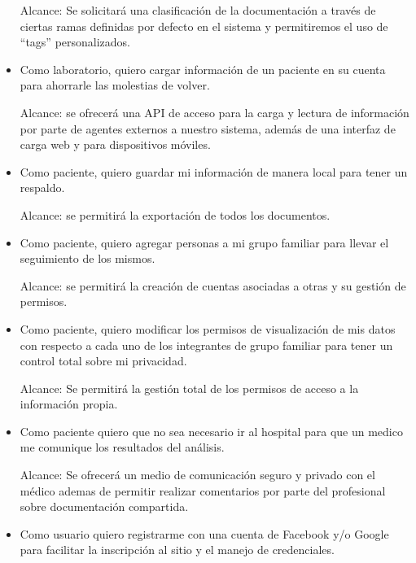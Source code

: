 \begin{itemize}
    Alcance: Se solicitará una clasificación de la documentación a través de ciertas ramas definidas por defecto en el sistema y permitiremos el uso de ``tags'' personalizados.
	\item Como laboratorio, quiero cargar información de un paciente en su cuenta para ahorrarle las molestias de volver.
    
   Alcance: se ofrecerá una API de acceso para la carga y lectura de información por parte de agentes externos a nuestro sistema, además de una interfaz de carga web y para dispositivos móviles.
    \item Como paciente, quiero guardar mi información de manera local para tener un respaldo.
    
    Alcance: se permitirá la exportación de todos los documentos.
	\item Como paciente, quiero agregar personas a mi grupo familiar para llevar el seguimiento de los mismos.
    
    Alcance: se permitirá la creación de cuentas asociadas a otras y su gestión de permisos.
	\item Como paciente, quiero modificar los permisos de visualización de mis datos con respecto a  cada uno de los integrantes de grupo familiar para tener un control total sobre mi privacidad.
    
    Alcance: Se permitirá la gestión total de los permisos de acceso a la información propia.
	\item Como paciente quiero que no sea necesario ir al hospital para que un medico me comunique los resultados del análisis.
    
    Alcance: Se ofrecerá un medio de comunicación seguro y privado con el médico ademas de permitir realizar comentarios por parte del profesional sobre documentación compartida.
    
	\item Como usuario quiero registrarme con una cuenta de Facebook y/o Google para facilitar la inscripción al sitio y el manejo de credenciales.
    

\end{itemize}
